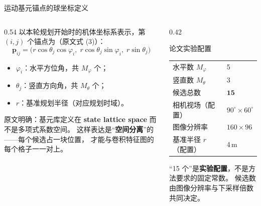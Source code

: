 \begin{frame}{运动基元锚点的球坐标定义}
  \small
  \begin{columns}[t]
    \begin{column}{0.54\textwidth}
      以本轮规划开始时的机体坐标系表示，第 $(i,j)$ 个锚点为（原文式 (3)）：
      \[
        \mathbf p_{ij}=\bigl(r\cos\theta_j\cos\varphi_i,\;
        r\cos\theta_j\sin\varphi_i,\; r\sin\theta_j\bigr)
      \]
      \begin{itemize}\tight
        \item $\varphi_i$：水平方位角，共 $M_\varphi$ 个；
        \item $\theta_j$：竖直方向角，共 $M_\theta$ 个；
        \item $r$：基准规划半径（对应规划时域）。
      \end{itemize}
      \begin{reading}[基元库的表达空间]
        \scriptsize
        原文明确：基元库定义在 \textbf{state lattice space} 而不是多项式系数空间。
        这样表达是“\textbf{空间分离}”的——每个候选占一块位置，
        才能与卷积特征图的每个格子一一对上。
      \end{reading}
    \end{column}
    \begin{column}{0.42\textwidth}
      \begin{block}{论文实验配置}
        \scriptsize
        \begin{tabular}{@{}ll@{}}
          \toprule
          水平数 $M_\varphi$ & 5 \\
          竖直数 $M_\theta$ & 3 \\
          候选总数 & $\mathbf{15}$ \\
          相机视场（配置） & $90^\circ\times60^\circ$ \\
          图像分辨率 & $160\times96$ \\
          基准半径 $r$（配置） & 4\,m \\
          \bottomrule
        \end{tabular}
      \end{block}
      \begin{reading}
        \scriptsize
        “15 个”是\textbf{实验配置}，不是方法要求的固定常数。
        候选数由图像分辨率与下采样倍数共同决定。
      \end{reading}
    \end{column}
  \end{columns}
\end{frame}

